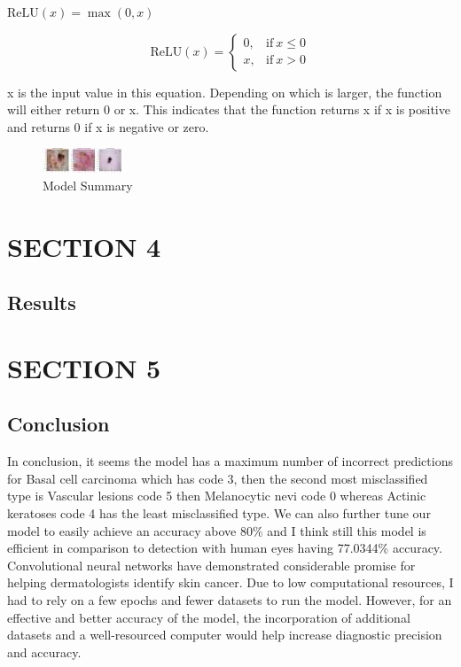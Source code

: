 \documentclass{article}
\begin{document}
\( \text{ReLU}(x) = \max(0, x) \)

\[
\text{ReLU}(x) = 
\begin{cases}
0, & \text{if}\ x \leq 0 \\
x, & \text{if}\ x > 0
\end{cases}
\]


x is the input value in this equation. Depending on which is larger, the function will either return 0 or x. This indicates that the function returns x if x is positive and returns 0 if x is negative or zero.


\begin{figure}
  \centering
  \includegraphics[width=\textwidth]{derry.jpg}
  \caption{Model Summary}
  \label{fig:image}
\end{figure}


\section{SECTION 4}
\subsection{Results}



\section{SECTION 5}
\subsection{Conclusion}
In conclusion, it seems the model has a maximum number of incorrect predictions for Basal cell carcinoma which has code 3, then the second most misclassified type is Vascular lesions code 5 then Melanocytic nevi code 0 whereas Actinic keratoses code 4 has the least misclassified type.
We can also further tune our model to easily achieve an accuracy above 80\% and I think still this model is efficient in comparison to detection with human eyes having 77.0344\% accuracy.
Convolutional neural networks have demonstrated considerable promise for helping dermatologists identify skin cancer. Due to low computational resources, I had to rely on a few epochs and fewer datasets to run the model. However, for an effective and better accuracy of the model, the incorporation of additional datasets and a well-resourced computer would help increase diagnostic precision and accuracy.




\end{document}
